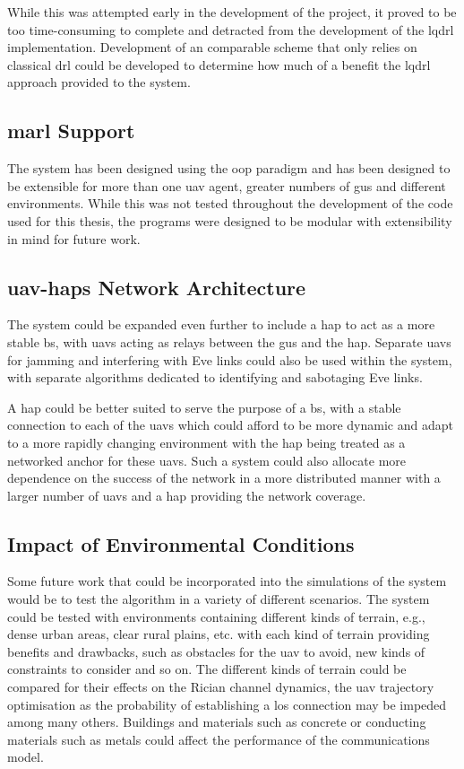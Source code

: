 While this was attempted early in the development of the project, it proved to be too time-consuming to complete and detracted from the development of the \acrshort{lqdrl} implementation. 
Development of an comparable scheme that only relies on classical \acrshort{drl} could be developed to determine how much of a benefit the \acrshort{lqdrl} approach provided to the system. 
\subsection{\texorpdfstring{\acrshort{marl}}{MARL} Support}
The system has been designed using the \acrshort{oop} paradigm and has been designed to be extensible for more than one \acrshort{uav} agent, greater numbers of \acrshort{gu}s and different environments. 
While this was not tested throughout the development of the code used for this thesis, the programs were designed to be modular with extensibility in mind for future work. 
\subsection{\texorpdfstring{\acrshort{uav}-\acrshort{hap}s}{UAV-HAPs} Network Architecture}
The system could be expanded even further to include a \acrshort{hap} to act as a more stable \acrshort{bs}, with \acrshort{uav}s acting as relays between the \acrshort{gu}s and the \acrshort{hap}. 
Separate \acrshort{uav}s for jamming and interfering with Eve links could also be used within the system, with separate algorithms dedicated to identifying and sabotaging Eve links. 

A \acrshort{hap} could be better suited to serve the purpose of a \acrshort{bs}, with a stable connection to each of the \acrshort{uav}s which could afford to be more dynamic and adapt to a more rapidly changing environment with the \acrshort{hap} being treated as a networked anchor for these \acrshort{uav}s. 
Such a system could also allocate more dependence on the success of the network in a more distributed manner with a larger number of \acrshort{uav}s and a \acrshort{hap} providing the network coverage. 
\subsection{Impact of Environmental Conditions}
Some future work that could be incorporated into the simulations of the system would be to test the algorithm in a variety of different scenarios. 
The system could be tested with environments containing different kinds of terrain, e.g., dense urban areas, clear rural plains, etc. with each kind of terrain providing benefits and drawbacks, such as obstacles for the \acrshort{uav} to avoid, new kinds of constraints to consider and so on. 
The different kinds of terrain could be compared for their effects on the Rician channel dynamics, the \acrshort{uav} trajectory optimisation as the probability of establishing a \acrshort{los} connection may be impeded among many others. 
Buildings and materials such as concrete or conducting materials such as metals could affect the performance of the communications model. 

